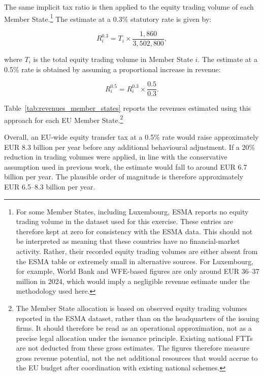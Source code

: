 \documentclass[../../main]{subfiles}
\begin{document}
The same implicit tax ratio is then applied to the equity trading volume of each Member State.\footnote{For some Member States, including Luxembourg, ESMA reports no equity trading volume in the dataset used for this exercise. These entries are therefore kept at zero for consistency with the ESMA data. This should not be interpreted as meaning that these countries have no financial-market activity. Rather, their recorded equity trading volumes are either absent from the ESMA table or extremely small in alternative sources. For Luxembourg, for example, World Bank and WFE-based figures are only around EUR 36--37 million in 2024, which would imply a negligible revenue estimate under the methodology used here.} The estimate at a 0.3\% statutory rate is given by:

\[
R_i^{0.3} = T_i \times \frac{1,860}{3,502,800},
\]

\noindent where \(T_i\) is the total equity trading volume in Member State \(i\). The estimate at a 0.5\% rate is obtained by assuming a proportional increase in revenue:

\[
R_i^{0.5} = R_i^{0.3} \times \frac{0.5}{0.3}.
\]

Table~\ref{tab:revenues_member_states} reports the revenues estimated using this approach for each EU Member State.\footnote{The Member State allocation is based on observed equity trading volumes reported in the ESMA dataset, rather than on the headquarters of the issuing firms. It should therefore be read as an operational approximation, not as a precise legal allocation under the issuance principle. Existing national FTTs are not deducted from these gross estimates. The figures therefore measure gross revenue potential, not the net additional resources that would accrue to the EU budget after coordination with existing national schemes.} 

Overall, an EU-wide equity transfer tax at a 0.5\% rate would raise approximately EUR 8.3 billion per year before any additional behavioural adjustment. If a 20\% reduction in trading volumes were applied, in line with the conservative assumption used in previous work, the estimate would fall to around EUR 6.7 billion per year. The plausible order of magnitude is therefore approximately EUR 6.5--8.3 billion per year.
\end{document}
